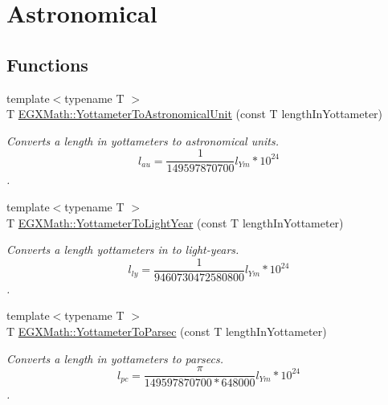 \hypertarget{group___e_g_x_math-_conversions-_length_conversions-_yottameter-_astronomical}{}\section{Astronomical}
\label{group___e_g_x_math-_conversions-_length_conversions-_yottameter-_astronomical}
\subsection*{Functions}
\begin{DoxyCompactItemize}
\item 
{\footnotesize template$<$typename T $>$ }\\T \mbox{\hyperlink{group___e_g_x_math-_conversions-_length_conversions-_yottameter-_astronomical_gab75681ecd108900ae547e58495a62dd3}{E\+G\+X\+Math\+::\+Yottameter\+To\+Astronomical\+Unit}} (const T length\+In\+Yottameter)
\begin{DoxyCompactList}\small\item\em Converts a length in yottameters to astronomical units. \[ l_{au}= \frac{1}{149597870700} l_{Ym} * 10^{24} \]. \end{DoxyCompactList}\item 
{\footnotesize template$<$typename T $>$ }\\T \mbox{\hyperlink{group___e_g_x_math-_conversions-_length_conversions-_yottameter-_astronomical_ga0ab87688c8dea9fb838a3bca34cba82c}{E\+G\+X\+Math\+::\+Yottameter\+To\+Light\+Year}} (const T length\+In\+Yottameter)
\begin{DoxyCompactList}\small\item\em Converts a length yottameters in to light-\/years. \[ l_{ly}= \frac{1}{9460730472580800} l_{Ym} * 10^{24} \]. \end{DoxyCompactList}\item 
{\footnotesize template$<$typename T $>$ }\\T \mbox{\hyperlink{group___e_g_x_math-_conversions-_length_conversions-_yottameter-_astronomical_gadcada2ea03efbd6c010a780b87daf01f}{E\+G\+X\+Math\+::\+Yottameter\+To\+Parsec}} (const T length\+In\+Yottameter)
\begin{DoxyCompactList}\small\item\em Converts a length in yottameters to parsecs. \[ l_{pc}=\frac{\pi}{149597870700 * 648000} l_{Ym} * 10^{24} \]. \end{DoxyCompactList}\end{DoxyCompactItemize}


